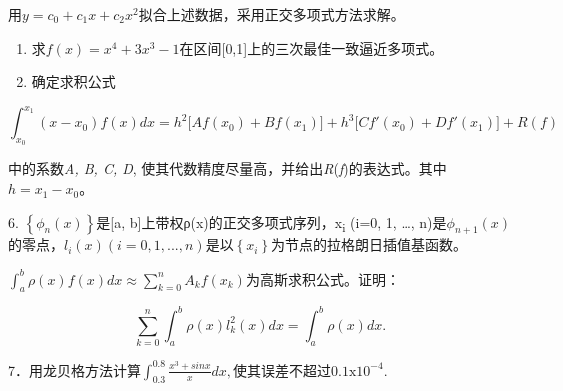 \documentclass[fontset=exam]{exam-zh}
\begin{document}
用\(y = c_{0} + c_{1}x + c_{2}x^{2}\)拟合上述数据，采用正交多项式方法求解。

\begin{enumerate}
\def\labelenumi{\arabic{enumi}.}
\setcounter{enumi}{3}
\item
  求\(f(x) = x^{4} + 3x^{3} - 1\)在区间{[}0,1{]}上的三次最佳一致逼近多项式。
\item
  确定求积公式
\end{enumerate}

\[{\int_{x_{0}}^{x_{1}}{(x - x_{0})f(x)dx}} = h^{2}\lbrack Af(x_{0}) + Bf(x_{1})\rbrack + h^{3}\lbrack Cf'(x_{0}) + Df'(x_{1})\rbrack + R(f)\]

中的系数\emph{A, B, C, D}, 使其代数精度尽量高，并给出\emph{R}(\emph{f})的表达式。其中\(h = x_{1} - x_{0}\)。

6. \(\left\{ \phi_{n}(x) \right\}\)是{[}a, b{]}上带权ρ(x)的正交多项式序列，x\textsubscript{i} (i=0, 1, \ldots, n)是\(\phi_{n + 1}(x)\)的零点，\(l_{i}(x)(i = 0,1,...,n)\)是以\(\left\{ x_{i} \right\}\)为节点的拉格朗日插值基函数。

\({\int_{a}^{b}{\rho(x)f(x)dx}} \approx {\sum\limits_{k = 0}^{n}{A_{k}f(x_{k})}}\)为高斯求积公式。证明：

\[{\sum\limits_{k = 0}^{n}{\int_{a}^{b}{\rho(x)l_{k}^{2}(x)dx}}} = {\int_{a}^{b}{\rho(x)dx}}.\]

7．用龙贝格方法计算\(\int_{0.3}^{0.8}{\frac{x^{3} + sinx}{x}dx,}\)使其误差不超过\(0.1\text{x}10^{- 4}.\)
\end{document}

